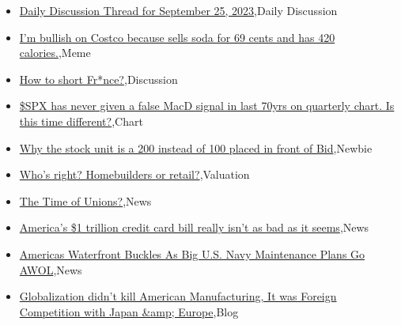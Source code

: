 \documentclass{article}%
\begin{document}
%
\begin{itemize}%
\item%
\href{https://reddit.com/r/wallstreetbets/comments/16rnuej/daily\_discussion\_thread\_for\_september\_25\_2023/}{Daily Discussion Thread for September 25, 2023},Daily Discussion%
\item%
\href{https://reddit.com/r/wallstreetbets/comments/16rjxjj/im\_bullish\_on\_costco\_because\_sells\_soda\_for\_69/}{I'm bullish on Costco because sells soda for 69 cents and has 420 calories.},Meme%
\item%
\href{https://reddit.com/r/wallstreetbets/comments/16rjuve/how\_to\_short\_frnce/}{How to short Fr*nce?},Discussion%
\item%
\href{https://reddit.com/r/wallstreetbets/comments/16rjgmn/spx\_has\_never\_given\_a\_false\_macd\_signal\_in\_last/}{\$SPX has never given a false MacD signal in last 70yrs on quarterly chart. Is this time different?},Chart%
\item%
\href{https://reddit.com/r/StockMarket/comments/16rh9zh/why\_the\_stock\_unit\_is\_a\_200\_instead\_of\_100\_placed/}{Why the stock unit is a 200 instead of 100 placed in front of Bid},Newbie%
\item%
\href{https://reddit.com/r/StockMarket/comments/16ql5iz/whos\_right\_homebuilders\_or\_retail/}{Who's right? Homebuilders or retail?},Valuation%
\item%
\href{https://reddit.com/r/StockMarket/comments/16q09dl/the\_time\_of\_unions/}{The Time of Unions?},News%
\item%
\href{https://reddit.com/r/Economics/comments/16ri4do/americas\_1\_trillion\_credit\_card\_bill\_really\_isnt/}{America's \$1 trillion credit card bill really isn't as bad as it seems},News%
\item%
\href{https://reddit.com/r/Economics/comments/16rfa2g/americas\_waterfront\_buckles\_as\_big\_us\_navy/}{Americas Waterfront Buckles As Big U.S. Navy Maintenance Plans Go AWOL},News%
\item%
\href{https://reddit.com/r/Economics/comments/16r9uop/globalization\_didnt\_kill\_american\_manufacturing/}{Globalization didn't kill American Manufacturing, It was Foreign Competition with Japan \&amp; Europe},Blog%
\end{itemize}%
\end{document}
